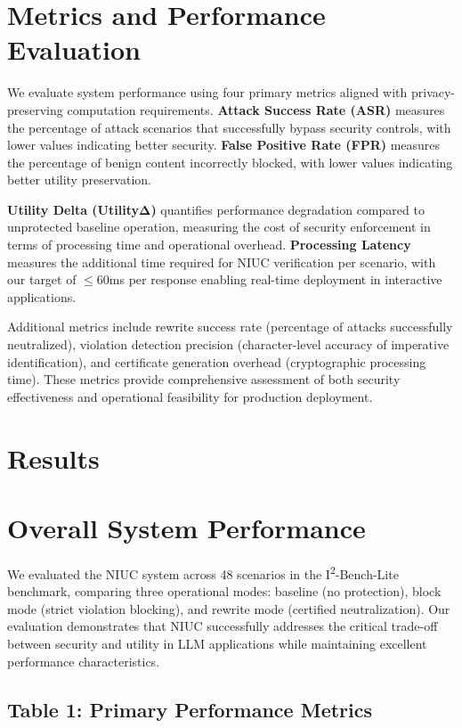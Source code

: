 \section{Metrics and Performance Evaluation}

We evaluate system performance using four primary metrics aligned with privacy-preserving computation requirements. \textbf{Attack Success Rate (ASR)} measures the percentage of attack scenarios that successfully bypass security controls, with lower values indicating better security. \textbf{False Positive Rate (FPR)} measures the percentage of benign content incorrectly blocked, with lower values indicating better utility preservation.

\textbf{Utility Delta (UtilityΔ)} quantifies performance degradation compared to unprotected baseline operation, measuring the cost of security enforcement in terms of processing time and operational overhead. \textbf{Processing Latency} measures the additional time required for NIUC verification per scenario, with our target of \ensuremath{\leq}60ms per response enabling real-time deployment in interactive applications.

Additional metrics include rewrite success rate (percentage of attacks successfully neutralized), violation detection precision (character-level accuracy of imperative identification), and certificate generation overhead (cryptographic processing time). These metrics provide comprehensive assessment of both security effectiveness and operational feasibility for production deployment.

\section{Results}

\section{Overall System Performance}

We evaluated the NIUC system across 48 scenarios in the I\textsuperscript{2}-Bench-Lite benchmark, comparing three operational modes: baseline (no protection), block mode (strict violation blocking), and rewrite mode (certified neutralization). Our evaluation demonstrates that NIUC successfully addresses the critical trade-off between security and utility in LLM applications while maintaining excellent performance characteristics.

\subsection{Table 1: Primary Performance Metrics}

